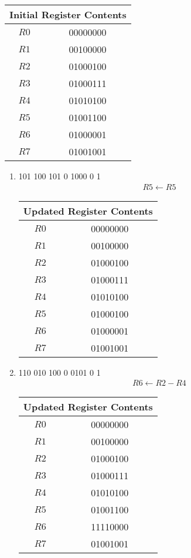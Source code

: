 \documentclass[12pt,letterpaper,titlepage]{report}
\begin{document}
\begin{raggedright}
\begin{center}
\begin{tabular}{|c|c|}\hline 
\multicolumn{2}{|c|}{Initial Register Contents}\\ \hline\hline
$R0$ & 00000000 \\ \hline
$R1$ & 00100000 \\ \hline
$R2$ & 01000100 \\ \hline
$R3$ & 01000111 \\ \hline
$R4$ & 01010100 \\ \hline
$R5$ & 01001100 \\ \hline
$R6$ & 01000001 \\ \hline
$R7$ & 01001001 \\ \hline
\end{tabular}
\end{center}

\begin{multicols}{2}

\begin{enumerate}[noitemsep, label=\alph*)]
\item 101 100 101 0 1000 0 1
\begin{align*}
R5 \gets R5
\end{align*}
\begin{center}
\begin{tabular}{|c|c|}\hline 
\multicolumn{2}{|c|}{Updated Register Contents}\\ \hline\hline
$R0$ & 00000000 \\ \hline
$R1$ & 00100000 \\ \hline
$R2$ & 01000100 \\ \hline
$R3$ & 01000111 \\ \hline
$R4$ & 01010100 \\ \hline
$R5$ & 01000100 \\ \hline
$R6$ & 01000001 \\ \hline
$R7$ & 01001001 \\ \hline
\end{tabular}
\end{center}

\item 110 010 100 0 0101 0 1
\begin{align*}
R6 \gets R2 - R4
\end{align*}
\begin{center}
\begin{tabular}{|c|c|}\hline 
\multicolumn{2}{|c|}{Updated Register Contents}\\ \hline\hline
$R0$ & 00000000 \\ \hline
$R1$ & 00100000 \\ \hline
$R2$ & 01000100 \\ \hline
$R3$ & 01000111 \\ \hline
$R4$ & 01010100 \\ \hline
$R5$ & 01001100 \\ \hline
$R6$ & 11110000 \\ \hline
$R7$ & 01001001 \\ \hline
\end{tabular}
\end{center}


\end{enumerate}
\end{multicols}
\end{raggedright}
\end{document}
